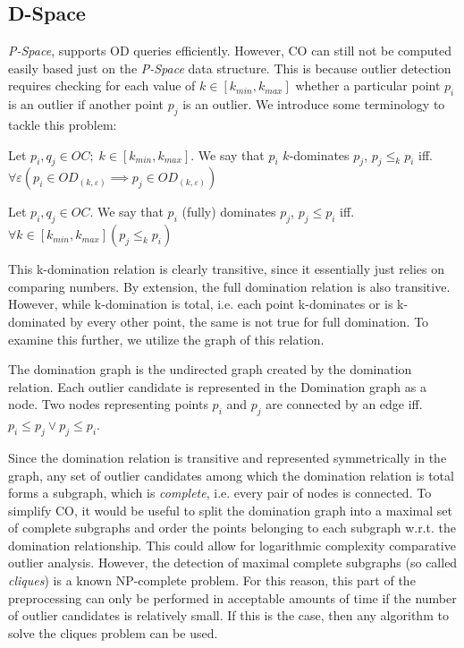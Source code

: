 \documentclass[runningheads]{llncs}
\begin{document}
\subsection{D-Space}
\emph{P-Space}, supports OD queries efficiently. However, CO can still not be computed easily based just on the \emph{P-Space} data structure. This is because outlier detection requires checking for each value of $k \in [k_{min},k_{max}]$ whether a particular point $p_i$ is an outlier if another point $p_j$ is an outlier. We introduce some terminology to tackle this problem:
\begin{definition}[k-domination]
Let $p_i,q_j \in OC;\; k\in [k_{min},k_{max}]$. We say that $p_i$ $k$-dominates $p_j$, $p_j \leq_{k} p_i$ iff. $\forall\varepsilon(p_i \in OD_{(k,\varepsilon)} \implies p_j \in OD_{(k,\varepsilon)})$
\end{definition}
\begin{definition}
Let $p_i,q_j \in OC$. We say that $p_i$ (fully) dominates $p_j$, $p_j \leq p_i$ iff. $\forall k\in [k_{min},k_{max}](p_j \leq_k p_i)$
\end{definition}
This k-domination relation is clearly transitive, since it essentially just relies on comparing numbers. By extension, the full domination relation is also transitive. However, while k-domination is total, i.e. each point k-dominates or is k-dominated by every other point, the same is not true for full domination. To examine this further, we utilize the graph of this relation.
\begin{definition}
The domination graph is the undirected graph created by the domination relation. Each outlier candidate is represented in the Domination graph as a node. Two nodes representing points $p_i$ and $p_j$ are connected by an edge iff. $p_i \leq p_j \vee p_j \leq p_i$.
\end{definition}

Since the domination relation is transitive and represented symmetrically in the graph, any set of outlier candidates among which the domination relation is total forms a subgraph, which is \emph{complete}, i.e. every pair of nodes is connected. To simplify CO, it would be useful to split the domination graph into a maximal set of complete subgraphs and order the points belonging to each subgraph w.r.t. the domination relationship. This could allow for logarithmic complexity comparative outlier analysis. However, the detection of maximal complete subgraphs (so called \emph{cliques}) is a known NP-complete problem. For this reason, this part of the preprocessing can only be performed in acceptable amounts of time if the number of outlier candidates is relatively small. If this is the case, then any algorithm to solve the cliques problem can be used.
\end{document}
